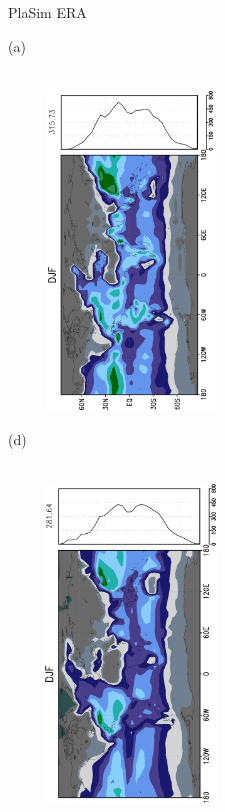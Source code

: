 \documentclass[12pt,a4paper,twoside,openright,headinclude,liststotoc,bibtotoc]{scrreprt}
\begin{document}
\begin{figure}[H]
\hspace{2.9cm}PlaSim \vspace{0.2cm}\hspace{7.2cm} ERA \\
\parbox{8.5cm}{\hspace{0.50cm}\begin{scriptsize}(a)\end{scriptsize} \vspace{-0.7cm} \\
\includegraphics[height=8.5cm,width=6.5cm,angle=-90]
{eps/zonalysmevap182DJF.eps}
}
\parbox{8.5cm}{\hspace{0.30cm}\begin{scriptsize}(d)\end{scriptsize} \vspace{-0.7cm} \\
\includegraphics[height=8.5cm,width=6.5cm,angle=-90]
{eps/zonalt21ysmevapDJF.eps}
}
\end{figure}
\end{document}
